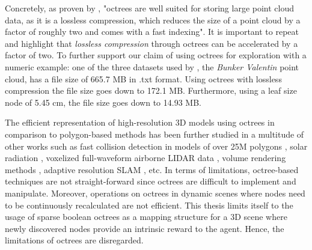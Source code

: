Concretely, as proven by \textcite{elseberg2013one}, "octrees are well suited for storing large point cloud data, as it is a lossless compression, which reduces the size of a point cloud by a factor of roughly two and comes with a fast indexing". It is important to repeat and highlight that \textit{lossless compression} through octrees can be accelerated by a factor of two. To further support our claim of using octrees for exploration with a numeric example: one of the three datasets used by \textcite{elseberg2013one}, the \textit{Bunker Valentin} point cloud, has a file size of 665.7 MB in .txt format. Using octrees with lossless compression the file size goes down to 172.1 MB. Furthermore, using a leaf size node of 5.45 cm, the file size goes down to 14.93 MB.

The efficient representation of high-resolution 3D models using octrees in comparison to polygon-based methods has been further studied in a multitude of other works such as fast collision detection in models of over 25M polygons \cite{melero2019fast}, solar radiation \cite{liang2017sparse}, voxelized full-waveform airborne LIDAR data \cite{miltiadou2021comparative}, volume rendering methods \cite{knoll2006survey}, adaptive resolution SLAM \cite{vespa2019adaptive}, etc. In terms of limitations, octree-based techniques are not straight-forward since octrees are difficult to implement and manipulate. Moreover, operations on octrees in dynamic scenes where nodes need to be continuously recalculated are not efficient. This thesis limits itself to the usage of sparse boolean octrees as a mapping structure for a 3D scene where newly discovered nodes provide an intrinsic reward to the agent. Hence, the limitations of octrees are disregarded.




